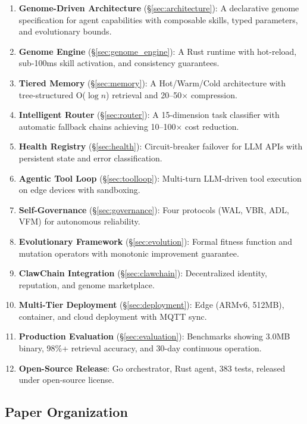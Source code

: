 \documentclass[conference]{IEEEtran}
\begin{document}
\begin{enumerate}[leftmargin=*]
    \item \textbf{Genome-Driven Architecture} (\S\ref{sec:architecture}): A declarative genome specification for agent capabilities with composable skills, typed parameters, and evolutionary bounds.
    \item \textbf{Genome Engine} (\S\ref{sec:genome_engine}): A Rust runtime with hot-reload, sub-100ms skill activation, and consistency guarantees.
    \item \textbf{Tiered Memory} (\S\ref{sec:memory}): A Hot/Warm/Cold architecture with tree-structured O($\log n$) retrieval and 20--50$\times$ compression.
    \item \textbf{Intelligent Router} (\S\ref{sec:router}): A 15-dimension task classifier with automatic fallback chains achieving 10--100$\times$ cost reduction.
    \item \textbf{Health Registry} (\S\ref{sec:health}): Circuit-breaker failover for LLM APIs with persistent state and error classification.
    \item \textbf{Agentic Tool Loop} (\S\ref{sec:toolloop}): Multi-turn LLM-driven tool execution on edge devices with sandboxing.
    \item \textbf{Self-Governance} (\S\ref{sec:governance}): Four protocols (WAL, VBR, ADL, VFM) for autonomous reliability.
    \item \textbf{Evolutionary Framework} (\S\ref{sec:evolution}): Formal fitness function and mutation operators with monotonic improvement guarantee.
    \item \textbf{ClawChain Integration} (\S\ref{sec:clawchain}): Decentralized identity, reputation, and genome marketplace.
    \item \textbf{Multi-Tier Deployment} (\S\ref{sec:deployment}): Edge (ARMv6, 512MB), container, and cloud deployment with MQTT sync.
    \item \textbf{Production Evaluation} (\S\ref{sec:evaluation}): Benchmarks showing 3.0MB binary, 98\%+ retrieval accuracy, and 30-day continuous operation.
    \item \textbf{Open-Source Release}: Go orchestrator, Rust agent, 383 tests, released under open-source license.
\end{enumerate}

\subsection{Paper Organization}
\end{document}
